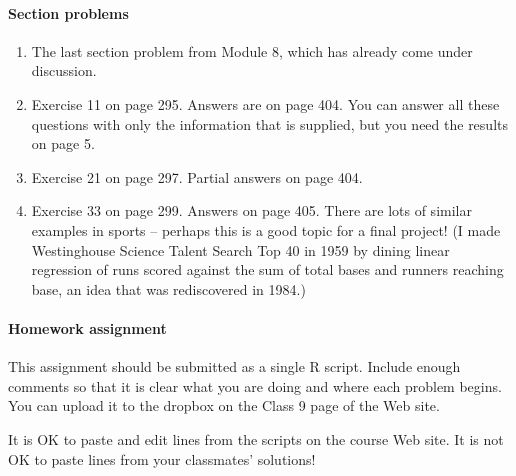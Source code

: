 \documentclass[12pt]{article}
\begin{document}
\pagebreak





\paragraph*{Section problems}

\begin{enumerate}

\item The last section problem from Module 8, which has already come under discussion.

\item Exercise 11 on page 295. Answers are on page 404. You can answer all these questions with only the information that is supplied, but you need the results on page 5.

\item Exercise 21 on page 297. Partial answers on page 404.

\item Exercise 33 on page 299. Answers on page 405. There are lots of similar examples in sports -- perhaps this is a good topic for a final project!  (I made Westinghouse Science Talent Search Top 40 in 1959 by dining linear regression of runs scored against the sum of total bases and runners reaching base, an idea that was rediscovered in 1984.)

\end{enumerate}



\pagebreak


\paragraph*{Homework assignment}

This assignment should be submitted as a single R script. Include enough comments so that it is clear what you are doing and where each problem begins. You can upload it to the dropbox on the Class 9 page of the Web site. 

It is OK to paste and edit lines from the scripts on the course Web site. It is not OK to paste lines from your classmates' solutions!
\end{document}
